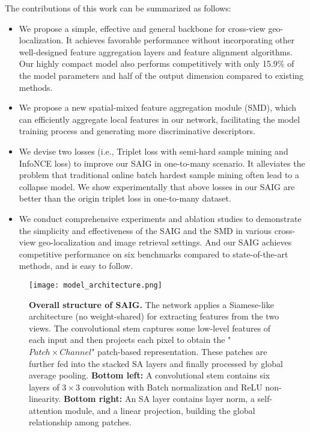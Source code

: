 \documentclass[sn-basic,iicol]{sn-jnl}
\theoremstyle{thmstyletwo}\newtheorem{example}{Example}\newtheorem{remark}{Remark}
\theoremstyle{thmstylethree}\newtheorem{definition}{Definition}
\begin{document}
The contributions of this work can be summarized as follows:
\begin{itemize}
\item We propose a simple, effective and general backbone for cross-view geo-localization. It achieves favorable performance without incorporating other well-designed feature aggregation layers and feature alignment algorithms. Our highly compact model also performs competitively with only 15.9\% of the model parameters and half of the output dimension compared to existing methods.

\item We propose a new spatial-mixed feature aggregation module (SMD), which can efficiently aggregate local features in our network, facilitating the model training process and generating more discriminative descriptors.

\item We devise two losses (i.e., Triplet loss with semi-hard sample mining and InfoNCE loss) to improve our SAIG in one-to-many scenario. It alleviates the problem that traditional online batch hardest sample mining often lead to a collapse model. We show experimentally that above losses in our SAIG are better than the origin triplet loss in one-to-many dataset.

\item We conduct comprehensive experiments and ablation studies to demonstrate the simplicity and effectiveness of the SAIG and the SMD in various cross-view geo-localization and image retrieval settings. And our SAIG achieves competitive performance on six benchmarks compared to state-of-the-art methods, and is easy to follow.
\end{itemize}

\begin{figure*}
\centering
\texttt{[image: model\_architecture.png]}
\caption{\textbf{Overall structure of SAIG.} The network applies a Siamese-like architecture (no weight-shared) for extracting features from the two views. The convolutional stem captures some low-level features of each input and then projects each pixel to obtain the "$Patch\times Channel$" patch-based representation. These patches are further fed into the stacked SA layers and finally processed by global average pooling. \textbf{Bottom left:} A convolutional stem contains six layers of $3\times3$ convolution with Batch normalization and ReLU non-linearity. \textbf{Bottom right:} An SA layer contains layer norm, a self-attention module, and a linear projection, building the global relationship among patches.} 
\label{model_architecture}
\vspace{-3pt}
\end{figure*}
\end{document}

